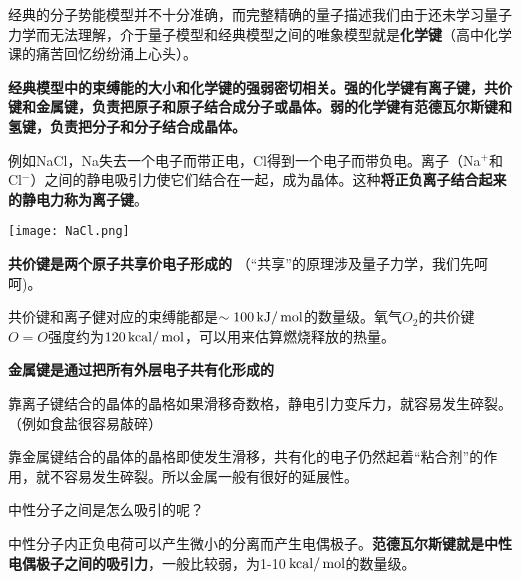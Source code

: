 \documentclass[CJK]{beamer}
\begin{document}
\begin{frame}
\bch
经典的分子势能模型并不十分准确，而完整精确的量子描述我们由于还未学习量子力学而无法理解，介于量子模型和经典模型之间的唯象模型就是{\bf 化学键}（高中化学课的痛苦回忆纷纷涌上心头\wulian）。

\skipline

{\bf 经典模型中的束缚能的大小和化学键的强弱密切相关。强的化学键有离子键，共价键和金属键，负责把原子和原子结合成分子或晶体。弱的化学键有范德瓦尔斯键和氢键，负责把分子和分子结合成晶体。}
\ech
\end{frame}

\begin{frame}
\bch

例如NaCl，Na失去一个电子而带正电，Cl得到一个电子而带负电。离子（Na$^+$和Cl$^{-}$）之间的静电吸引力使它们结合在一起，成为晶体。这种{\bf 将正负离子结合起来的静电力称为离子键}。

\skipline

\bcenter
\texttt{[image: NaCl.png]}
\ecenter

\ech
\end{frame}

\begin{frame}
\bch

{\bf 共价键是两个原子共享价电子形成的} （“共享”的原理涉及量子力学，我们先呵呵\bye)。

\skiplines

共价键和离子健对应的束缚能都是$\sim 100 \,\mathrm{kJ}/\,\mathrm{mol}$的数量级。氧气$O_2$的共价键$O=O$强度约为$120 \,\mathrm{kcal}/\,\mathrm{mol}$，可以用来估算燃烧释放的热量。
\ech
\end{frame}

\begin{frame}
\bch

{\bf 金属键是通过把所有外层电子共有化形成的}

\skipline

靠离子键结合的晶体的晶格如果滑移奇数格，静电引力变斥力，就容易发生碎裂。（例如食盐很容易敲碎）

\skipline

靠金属键结合的晶体的晶格即使发生滑移，共有化的电子仍然起着“粘合剂”的作用，就不容易发生碎裂。所以金属一般有很好的延展性。

\ech
\end{frame}

\begin{frame}
\bch

中性分子之间是怎么吸引的呢？

\skipline

中性分子内正负电荷可以产生微小的分离而产生电偶极子。{\bf 范德瓦尔斯键就是中性电偶极子之间的吸引力}，一般比较弱，为1-10$\,\mathrm{kcal}/\,\mathrm{mol}$的数量级。
\ech
\end{frame}
\end{document}
